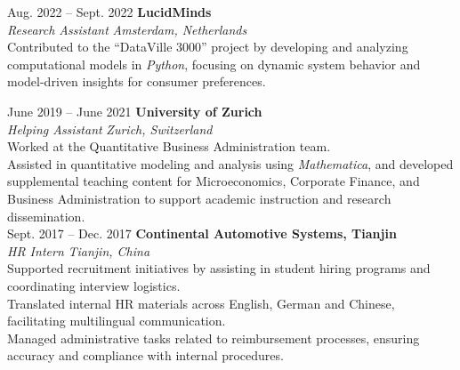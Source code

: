 \documentclass[a4paper,12pt]{article}
\makeatletter
\newenvironment{jobshort}[2]
    {
    \begin{tabularx}{\linewidth}{@{}l X r@{}}
    \textbf{#1} & \hfill &  #2 \\[3.75pt]
    \end{tabularx}
    }
    {
    }
\makeatother
\begin{document}
Aug. 2022 -- Sept. 2022 \hfill \textbf{LucidMinds} \\ %
\textit{Research Assistant} \hfill \textit{Amsterdam, Netherlands} \\
\textbullet Contributed to the “DataVille 3000” project by developing and analyzing computational models in \textit{Python}, focusing on dynamic system behavior and model-driven insights for consumer preferences.

June 2019 -- June 2021 \hfill \textbf{University of Zurich} \\
\textit{Helping Assistant} \hfill \textit{Zurich, Switzerland} \\
\textbullet Worked at the Quantitative Business Administration team. \\
\textbullet Assisted in quantitative modeling and analysis using \textit{Mathematica}, and developed supplemental teaching content for Microeconomics, Corporate Finance, and Business Administration to support academic instruction and research dissemination. \\


Sept. 2017 -- Dec. 2017 \hfill \textbf{Continental Automotive Systems, Tianjin} \\
\textit{HR Intern} \hfill \textit{Tianjin, China} \\
\textbullet Supported recruitment initiatives by assisting in student hiring programs and coordinating interview logistics. \\
\textbullet Translated internal HR materials across English, German and Chinese, facilitating multilingual communication. \\
\textbullet Managed administrative tasks related to reimbursement processes, ensuring accuracy and compliance with internal procedures. \\
\end{document}

